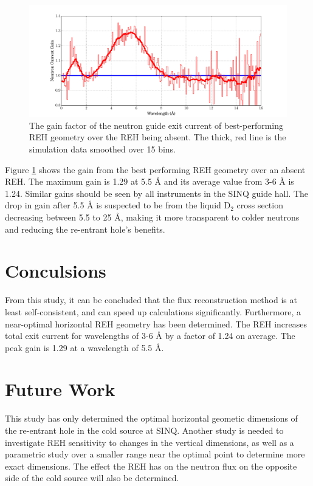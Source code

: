 \documentclass[a4paper]{jpconf}
\begin{document}
\begin{figure}
\begin{center}
\includegraphics[scale=0.38,trim={0cm 0cm 0cm 0cm},clip]{graphics/parametric_gain.pdf}
\end{center}
\caption{\label{parametric_gain}The gain factor of the neutron guide exit current of best-performing REH geometry over the REH being absent.  The thick, red line is the simulation data smoothed over 15 bins.}
\end{figure}


Figure \ref{parametric_gain} shows the gain from the best performing REH geometry over an absent REH.  The maximum gain is 1.29 at 5.5 \AA{} and its average value from 3-6 \AA{} is 1.24.  Similar gains should be seen by all instruments in the SINQ guide hall.  The drop in gain after 5.5 \AA{} is suspected to be from the liquid D$_2$ cross section decreasing between 5.5 to 25 \AA{}, making it more transparent to colder neutrons and reducing the re-entrant hole's benefits.


\section{Conculsions}

From this study, it can be concluded that the flux reconstruction method is at least self-consistent, and can speed up calculations significantly.  Furthermore, a near-optimal horizontal REH geometry has been determined.  The REH increases total exit current for wavelengths of 3-6 \AA{} by a factor of 1.24 on average. The peak gain is 1.29 at a wavelength of 5.5 \AA{}.

\section{Future Work}

This study has only determined the optimal horizontal geometic dimensions of the re-entrant hole in the cold source at SINQ.  Another study is needed to investigate REH sensitivity to changes in the vertical dimensions, as well as a parametric study over a smaller range near the optimal point to determine more exact dimensions.  The effect the REH has on the neutron flux on the opposite side of the cold source will also be determined.
\end{document}
